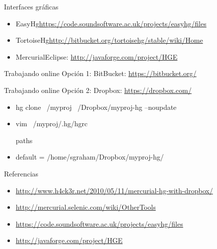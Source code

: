 \documentclass[spanish]{beamer}
\begin{document}
	\begin{frame}{Interfaces gráficas}
             \begin{itemize}
                \item EasyHg\url{https://code.soundsoftware.ac.uk/projects/easyhg/files}
                \item TortoiseHg\url{http://bitbucket.org/tortoisehg/stable/wiki/Home}
                \item MercurialEclipse: \url{http://javaforge.com/project/HGE}
             \end{itemize}
		
	\end{frame}
	
	\begin{frame}{Trabajando online}
		Opción 1: BitBucket: \url{https://bitbucket.org/}
	\end{frame}
               
	\begin{frame}{Trabajando online}
		Opción 2: Dropbox: \url{https://dropbox.com/}
		\begin{itemize}
			\item hg clone ~/myproj ~/Dropbox/myproj-hg --noupdate
			\item vim ~/myproj/.hg/hgrc
			\item [paths]
			\item default = /home/sgraham/Dropbox/myproj-hg/
		\end{itemize}
	\end{frame}
       
    \begin{frame}{Referencias}
	\begin{itemize}
	\item \url{http://www.h4ck3r.net/2010/05/11/mercurial-hg-with-dropbox/}
	\item \url{http://mercurial.selenic.com/wiki/OtherTools}
	\item \url{https://code.soundsoftware.ac.uk/projects/easyhg/files}
	\item \url{http://javaforge.com/project/HGE}
	\end{itemize}
        \end{frame}


 
\end{document}
